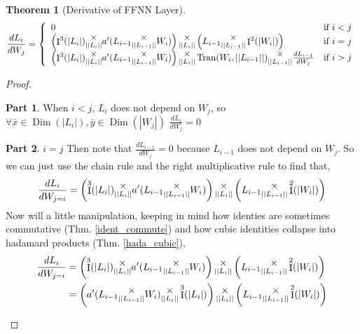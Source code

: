 \documentclass[12pt]{book}
\theoremstyle{plain}
\newtheorem{theorem}{Theorem}[chapter]
\theoremstyle{definition}
\theoremstyle{ppart}
\newtheorem{ppart}{Part}
\theoremstyle{case}
\theoremstyle{solution}
\DeclareMathOperator{\Dim}{Dim}
\DeclareMathOperator{\Ident}{I}
\DeclareMathOperator{\Tran}{Tran}
\newcommand{\mmult}[1]{\text{\raisebox{1ex}{$\underset{#1}{\times}$}}}
\newcommand{\shape}[1]{\left|#1\right|}
\begin{document}
\begin{landscape}
\begin{theorem}[Derivative of FFNN Layer]
\[
  \frac{dL_i}{dW_j}
	= \left\{
  \begin{array}{ll}
		0 & \mbox{if } i < j \\
    \left(\Ident^3(\shape{L_i}) \mmult{\shape{\shape{L_i}}} a'(L_{i-1} \mmult{\shape{\shape{L_{i-1}}}} W_i) \right) 
    \mmult{\shape{\shape{L_i}}}
    \left(L_{i-1} \mmult{\shape{\shape{L_{i-1}}}} \Ident^2(\shape{W_i})\right)
	  & \mbox{if } i = j \\
    \left(\Ident^3(\shape{L_i}) \mmult{\shape{\shape{L_i}}} a'(L_{i-1} \mmult{\shape{\shape{L_{i-1}}}} W_i) \right) 
    \mmult{\shape{\shape{L_i}}}
    \Tran(W_i, \shape{\shape{L_{i-1}}})
    \mmult{\shape{\shape{L_{i-1}}}}
    \frac{d L_{i-1}}{dW_j}
		& \mbox{if } i > j
  \end{array}
  \right.
\]
\end{theorem}
\begin{proof}
\begin{ppart} When $i < j$,
$L_i$ does not depend on $W_j$, so 
$\forall \bar{x} \in \Dim(\shape{L_i}), \bar{y} \in \Dim(\shape{W_j})$
$\frac{dL_i}{dW_j} = 0$
\end{ppart}
\begin{ppart} $i = j$
Then note that $\frac{dL_{i-1}}{dW_j} = 0$ because $L_{i-1}$ does not
depend on $W_j$. So we can just use the chain rule and the right multiplicative rule to find that,
\[
  \frac{dL_i}{dW_{j=i}} =
    \left(\Ident^3(\shape{L_i}) \mmult{\shape{\shape{L_i}}} a'(L_{i-1} \mmult{\shape{\shape{L_{i-1}}}} W_i) \right) 
    \mmult{\shape{\shape{L_i}}}
    \left(L_{i-1} \mmult{\shape{\shape{L_{i-1}}}} \Ident^2(\shape{W_i})\right)
\]
Now will a little manipulation, keeping in mind how identies are sometimes commutative (Thm. \ref{ident_commute})
and how cubic identities collapse into hadamard products (Thm. \ref{hada_cubic}),
\begin{align*}
  \frac{dL_i}{dW_{j=i}}
  &=
    \left(\Ident^3(\shape{L_i}) \mmult{\shape{\shape{L_i}}} a'(L_{i-1} \mmult{\shape{\shape{L_{i-1}}}} W_i)\right) 
    \mmult{\shape{\shape{L_i}}}
    \left(L_{i-1} \mmult{\shape{\shape{L_{i-1}}}} \Ident^2(\shape{W_i})\right) \\
  &=
    \left(a'(L_{i-1} \mmult{\shape{\shape{L_{i-1}}}} W_i) \mmult{\shape{\shape{L_i}}} \Ident^3(\shape{L_i})\right) 
    \mmult{\shape{\shape{L_i}}}
    \left(L_{i-1} \mmult{\shape{\shape{L_{i-1}}}} \Ident^2(\shape{W_i})\right) \\

\end{align*}
\end{ppart}
\end{proof}
\end{landscape}
\end{document}
